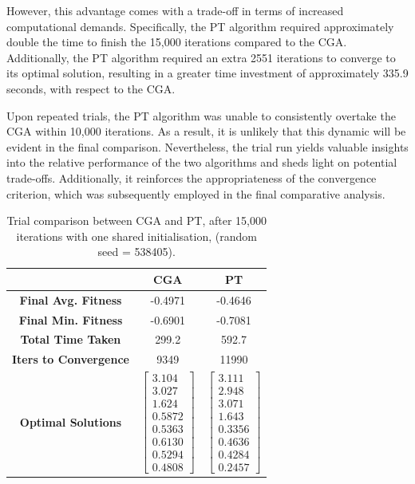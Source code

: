 \documentclass[10pt]{article}
\begin{document}
\begin{multicols}{2}
However, this advantage comes with a trade-off in terms of increased computational demands. Specifically, the PT algorithm required approximately double the time to finish the 15,000 iterations compared to the CGA. Additionally, the PT algorithm required an extra 2551 iterations to converge to its optimal solution, resulting in a greater time investment of approximately 335.9 seconds, with respect to the CGA.

Upon repeated trials, the PT algorithm was unable to consistently overtake the CGA within 10,000 iterations. As a result, it is unlikely that this dynamic will be evident in the final comparison. Nevertheless, the trial run yields valuable insights into the relative performance of the two algorithms and sheds light on potential trade-offs. Additionally, it reinforces the appropriateness of the convergence criterion, which was subsequently employed in the final comparative analysis.


\begin{table}[H]
    \centering
    \begin{tabular}{|c|c|c|}
    \hline
    & \textbf{CGA} & \textbf{PT} \\
    \hline
    \textbf{Final Avg. Fitness} & -0.4971 & -0.4646 \\
    \hline
    \textbf{Final Min. Fitness} & -0.6901 & -0.7081 \\
    \hline
    \textbf{Total Time Taken} & 299.2 & 592.7 \\
    \hline
    \textbf{Iters to Convergence} & 9349 & 11990 \\
    \hline
    \textbf{Optimal Solutions} & $\begin{bmatrix} 3.104 \\ 3.027 \\ 1.624 \\ 0.5872 \\ 0.5363 \\ 0.6130 \\ 0.5294 \\ 0.4808 \end{bmatrix}$ & $\begin{bmatrix} 3.111 \\ 2.948 \\ 3.071 \\ 1.643 \\ 0.3356 \\ 0.4636 \\ 0.4284 \\ 0.2457 \end{bmatrix}$ \\
    \hline
    \end{tabular}
    \caption{Trial comparison between CGA and PT, after 15,000 iterations with one shared initialisation, (random seed = 538405).}
    \label{tab:trial_comparison}
\end{table}


\end{multicols}
\end{document}
